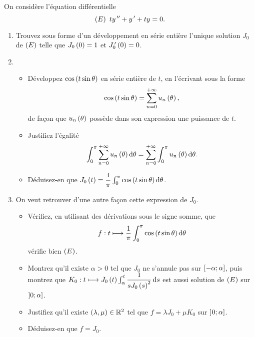 \begin{exoss}
On considère l'équation différentielle \[\left(E\right)~ty^{\,\prime\prime}+y^{\,\prime}+ty=0.\]

\begin{enumerate}
    \item Trouvez sous forme d'un développement en série entière l'unique solution \(J_0\) de \(\left(E\right)\) telle que \(J_0\left(0\right)=1\) et \(J_0^{\,\prime}\left(0\right)=0\). \\
    \item \begin{itemize}
        \item Développez \(\cos\left(t\sin\theta\right)\) en série entière de \(t\), en l'écrivant sous la forme \[\cos\left(t\sin\theta\right)=\sum_{n=0}^{+\infty}u_n\left(\theta\right),\] de façon que \(u_n\left(\theta\right)\) possède dans son expression une puissance de \(t\). \\
        \item Justifiez l'égalité \[\int_0^\pi\sum_{n=0}^{\pinf}u_n\paren{\theta}\odif{\theta}=\sum_{n=0}^{\pinf}\int_0^\pi u_n\paren{\theta}\odif{\theta}.\]
        \item Déduisez-en que \(J_0\paren{t}=\dfrac{1}{\pi}\int_0^\pi\cos\paren{t\sin\theta}\odif{\theta}\). \\
    \end{itemize}
    \item On veut retrouver d'une autre façon cette expression de \(J_0\). \\ \begin{itemize}
        \item Vérifiez, en utilisant des dérivations sous le signe somme, que \[f:t\mapsto\dfrac{1}{\pi}\int_0^\pi\cos\paren{t\sin\theta}\odif{\theta}\] vérifie bien \(\left(E\right)\). \\
        \item Montrez qu'il existe \(\alpha>0\) tel que \(J_0\) ne s'annule pas sur \(\left[-\alpha;\alpha\right]\), puis montrez que \(K_0:t\mapsto J_0\paren{t}\int_\alpha^t\dfrac{1}{sJ_0\paren{s}^2}\odif{s}\) est aussi solution de \(\left(E\right)\) sur \(\left]0;\alpha\right]\). \\
        \item Justifiez qu'il existe \(\left(\lambda,\mu\right)\in\mathbb{R}^2\) tel que \(f=\lambda J_0+\mu K_0\) sur \(\left]0;\alpha\right]\). \\
        \item Déduisez-en que \(f=J_0\).
    \end{itemize}
\end{enumerate}
\end{exoss}

